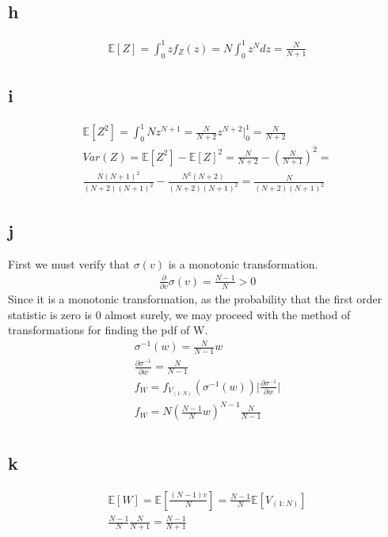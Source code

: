 \documentclass[10pt]{paper}
\begin{document}
\subsection*{h}

\begin{align*}
  \mathbb{E}[Z] = \int_0^1 zf_Z(z) = N \int_0^1 z^{N} dz = \frac{N}{N+1}
\end{align*}

\subsection*{i}

\begin{align*}
  \mathbb{E}[Z^2] = \int_0^1 N z^{N+1} = \frac{N}{N+2} z^{N+2} \big |_0^1 = \frac{N}{N+2}\\
  Var(Z) = \mathbb{E}[Z^2] - \mathbb{E}[Z]^2 = \frac{N}{N+2}-(\frac{N}{N+1})^2 =\\
  \frac{N(N+1)^2}{(N+2)(N+1)^2} - \frac{N^2(N+2)}{(N+2)(N+1)^2} = \frac{N}{(N+2)(N+1)^2}
\end{align*}

\subsection*{j}
First we must verify that $\sigma (v)$ is a monotonic transformation.
\begin{align*}
  \frac{\partial}{\partial v}\sigma (v) = \frac{N-1}{N} > 0
\end{align*}
Since it is a monotonic transformation, as the probability that the first order
statistic is zero is 0 almost surely, we may proceed with the method of
transformations for finding the pdf of W.
\begin{align*}
  \sigma^{-1}(w) = \frac{N}{N-1} w\\
  \frac{\partial \sigma^{-1}}{\partial w} = \frac{N}{N-1}\\
  f_W = f_{V_{(1:N)}}( \sigma^{-1}(w ) ) \big | \frac{\partial \sigma^{-1}}{\partial w} \big |\\
  f_W = N( \frac{N-1}{N} w )^{N-1} \frac{ N}{N-1}\\
\end{align*}

\subsection*{k}
\begin{align*}
  \mathbb{E}[W] = \mathbb{E}[\frac{(N-1)v}{N}] = \frac{N-1}{N} \mathbb{E}[V_{(1:N)}]\\
  \frac{N-1}{N} \frac{N}{N+1} = \frac{N-1}{N+1}
\end{align*}
\end{document}
